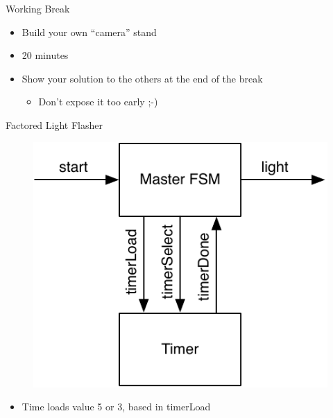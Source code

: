 \begin{frame}[fragile]{Working Break}
\begin{itemize}
\item Build your own ``camera'' stand
\item 20 minutes
\item Show your solution to the others at the end of the break
\begin{itemize}
\item Don't expose it too early ;-)
\end{itemize}
\end{itemize}
\end{frame}

\begin{frame}[fragile]{Factored Light Flasher}
\begin{figure}
  \includegraphics[scale=\scale]{../figures/flasher}
\end{figure}
\begin{itemize}
\item Time loads value 5 or 3, based in timerLoad
\end{itemize}
\end{frame}

